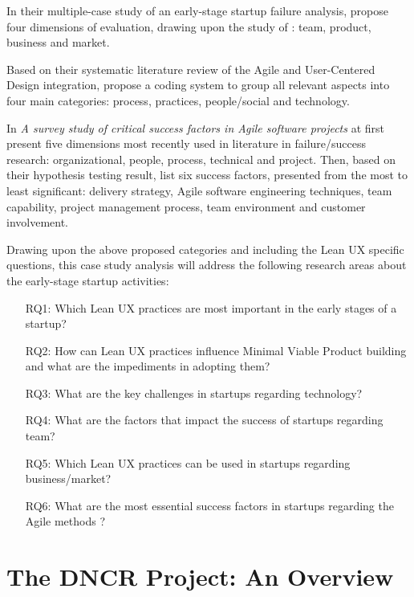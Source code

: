 \documentclass{article}
\begin{document}
In their multiple-case study of an early-stage startup failure analysis, \cite{giardino2014early} propose four dimensions of evaluation, drawing upon the study of \cite{macmillan1987criteria}: team, product, business and market.

Based on their systematic literature review of the Agile and User-Centered Design integration,  \cite{brhel2015exploring} propose a coding system to group all relevant aspects into four main categories: process, practices, people/social and technology.

In \textit{A survey study of critical success factors in Agile software projects} \cite{cao2008agile} at first present five dimensions most recently used in literature in failure/success research: organizational, people, process, technical and project. Then, based on their hypothesis testing result, \citeauthor{cao2008agile} list six success factors, presented from the most to least significant: delivery strategy, Agile software engineering techniques, team capability, project management process, team environment and customer involvement.

Drawing upon the above proposed categories and including the Lean UX specific questions, this case study analysis will address the following research areas about the early-stage startup activities:

\begin{itemize}
\item[RQ1:] Which Lean UX practices are most important in the early stages of a startup?
\item[RQ2:] How can Lean UX practices influence Minimal Viable Product building and what are the impediments in adopting them?
\item[RQ3:] What are the key challenges in startups regarding technology?
\item[RQ4:] What are the factors that impact the success of startups regarding team?
\item[RQ5:] Which Lean UX practices can be used in startups regarding business/market?
\item[RQ6:] What are the most essential success factors in startups regarding the Agile methods \citep{cao2008agile}?

\end{itemize}

\section{The DNCR Project: An Overview}
\label{sec:dncr-project}
\end{document}

